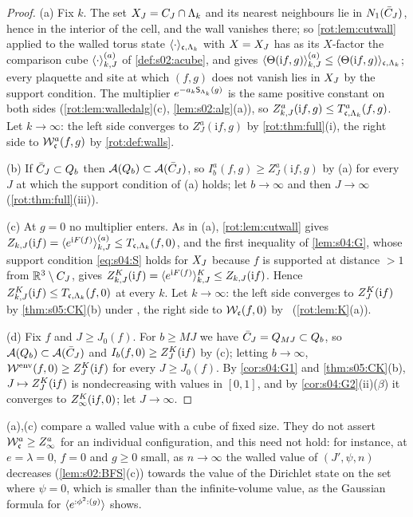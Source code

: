 \begin{proof}
(a) Fix $k$. The set $X_J=C_J\cap\Lambda_k$ and its nearest neighbours lie in $N_{1}(\bar C_J)$, hence in the interior of the cell, and the wall
vanishes there; so \cref{rot:lem:cutwall} applied to the walled torus state $\langle\cdot\rangle_{\mathfrak c,\Lambda_k}$ with $X=X_J$ has as its
$X$-factor the comparison cube $\langle \cdot\rangle^{(a)}_{k,J}$ of \cref{def:s02:acube}, and gives $\langle \Theta(\mathrm if,g)\rangle^{(a)}_{k,J}\le\langle\Theta(\mathrm if,g)\rangle_{\mathfrak c,\Lambda_k}$;
every plaquette and site at which $(f,g)$ does not vanish lies in $X_J$ by the support condition. The multiplier $e^{-a_k\mathsf S_{\Lambda_k}(g)}$
is the same positive constant on both sides (\cref{rot:lem:walledalg}(c), \cref{lem:s02:alg}(a)), so
$Z^a_{k,J}(\mathrm if,g)\le T^{a}_{\mathfrak c,\Lambda_k}(f,g)$. Let $k\to\infty$: the left side converges to $Z^a_J(\mathrm if,g)$ by
\cref{rot:thm:full}(i), the right side to $\mathcal W^a_{\mathfrak c}(f,g)$ by \cref{rot:def:walls}.

(b) If $\bar C_J\subset Q_{b}$ then $\mathcal A(Q_{b})\subset\mathcal A(\bar C_J)$, so $I^a_b(f,g)\ge Z^a_J(\mathrm if,g)$ by (a) for every $J$ at which the
support condition of (a) holds; let $b\to\infty$ and then $J\to\infty$ (\cref{rot:thm:full}(iii)).

(c) At $g=0$ no multiplier enters. As in (a), \cref{rot:lem:cutwall} gives $Z_{k,J}(\mathrm if)=\langle e^{\mathrm iF(f)}\rangle^{(a)}_{k,J}\le T_{\mathfrak c,\Lambda_k}(f,0)$,
and the first inequality of \cref{lem:s04:G}, whose support condition \eqref{eq:s04:S} holds for $X_J$ because $f$ is supported at
distance $>1$ from $\mathbb R^3\setminus C_J$, gives $Z^K_{k,J}(\mathrm if)=\langle e^{\mathrm iF(f)}\rangle^{K}_{k,J}\le Z_{k,J}(\mathrm if)$. Hence
$Z^K_{k,J}(\mathrm if)\le T_{\mathfrak c,\Lambda_k}(f,0)$ at every $k$. Let $k\to\infty$: the left side converges to $Z^{K}_{J}(\mathrm if)$ by
\cref{thm:s05:CK}(b) under \EC, the right side to $\mathcal W_{\mathfrak c}(f,0)$ by \Kz\ (\cref{rot:lem:K}(a)).

(d) Fix $f$ and $J\ge J_0(f)$. For $b\ge MJ$ we have $\bar C_J=Q_{MJ}\subset Q_{b}$, so $\mathcal A(Q_{b})\subset\mathcal A(\bar C_J)$ and
$I_b(f,0)\ge Z^{K}_{J}(\mathrm if)$ by (c); letting $b\to\infty$, $\mathcal W^{\mathrm{env}}(f,0)\ge Z^{K}_{J}(\mathrm if)$ for every $J\ge J_0(f)$. By
\cref{cor:s04:G1} and \cref{thm:s05:CK}(b), $J\mapsto Z^{K}_{J}(\mathrm if)$ is nondecreasing with values in $[0,1]$, and by
\cref{cor:s04:G2}(ii)($\beta$) it converges to $Z^{K}_{\infty}(\mathrm if,0)$; let $J\to\infty$.
\end{proof}

(a),(c) compare a walled value with a cube of fixed size. They do not assert $\mathcal W^a_{\mathfrak c}\ge Z^a_\infty$ for an
individual configuration, and this need not hold: for instance, at $e=\lambda=0$, $f=0$ and $g\ge0$ small, as $n\to\infty$ the walled
value of $(J',\psi,n)$ decreases (\cref{lem:s02:BFS}(c)) towards the value of the Dirichlet state on the set where $\psi=0$, which is
smaller than the infinite-volume value, as the Gaussian formula for $\langle e^{{:}\phi^2{:}(g)}\rangle$ shows.

